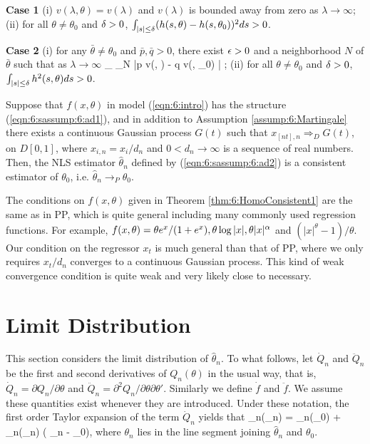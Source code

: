  {\bf Case 1} (i) $v(\lambda, \theta)  = v(\lambda)$ and $v(\lambda)$ is bounded away from zero as $\lambda \to \infty$; (ii) for all $\theta \ne \theta_0$ and $\delta > 0$, $\int_{|s| \le \delta} (h(s, \theta) - h(s, \theta_0))^2 ds > 0$.

 {\bf Case 2} (i) for any $\bar{\theta} \ne \theta_0$ and $\bar{p}, \bar{q} > 0$, there exist $\epsilon > 0$ and a neighborhood $N$ of $\bar{\theta}$ such that as $\lambda \to \infty$
\be
\inf_{} \inf_{\theta \in N} |p v(\lambda, \theta) - q v(\lambda, \theta_0) | \to \infty;
\ee
(ii) for all $\theta \ne \theta_0$ and $\delta > 0$, $\int_{|s| \le \delta} h^2(s, \theta)  ds > 0$.


\begin{thm}  Suppose that $f(x, \theta)$ in model (\ref {eqn:6:intro}) has the structure (\ref {eqn:6:sassump:6:ad1}), and in addition to Assumption \ref{assump:6:Martingale} there exists a continuous Gaussian process $G(t)$ such that $x_{[nt], n} \Rightarrow_D G(t)$, on $D[0,1]$, where $x_{i,n} = x_i / d_n$  and $0 < d_n \to \infty$ is a sequence of real numbers. Then,
 the NLS estimator $\hat{\theta}_n$ defined by (\ref {eqn:6:sassump:6:ad2}) is a consistent estimator of $\theta_0$, i.e. $\hat{\theta}_n \rightarrow_P \theta_0$.
\end{thm}





\begin{rem} The conditions on $f(x, \theta)$ given in Theorem \ref {thm:6:HomoConsistent1} are the same as in PP, which is quite general including many commonly used regression functions. For example, $f(x, \theta) = \theta e^{x}/(1 + e^x), \theta \log |x|, \theta |x|^\alpha$ and $(|x|^\theta - 1)/\theta$.  Our condition on the regressor $x_t$ is much general than that of PP, where we only requires $x_t / d_n$ converges to a continuous Gaussian  process. This kind of weak convergence condition is quite weak and very likely close to necessary.
\end{rem}



\section{Limit Distribution}
This section considers the limit distribution of $\hat{\theta}_n$. To what follows,  let $\dot{Q}_n$ and $\ddot{Q}_n$ be the first and second derivatives of $Q_n(\theta)$ in the usual way, that is, $\dot{Q}_n=\partial Q_n / \partial \theta$ and $\ddot{Q}_n=\partial^2 Q_n / \partial \theta \partial \theta'$. Similarly we define $\dot{f}$  and $\ddot{f}$. We assume these quantities exist whenever they are introduced. Under these notation,  the first order Taylor expansion of the term $\dot{Q}_n$ yields that
\be
{}_n(\hat{\theta}_n) = _n(\theta_0) + _n(\theta_n) ( \hat{\theta}_n - \theta_0), 
\ee
where $\theta_n$ lies in the line segment joining $\hat{\theta}_n$ and $\theta_0$.

